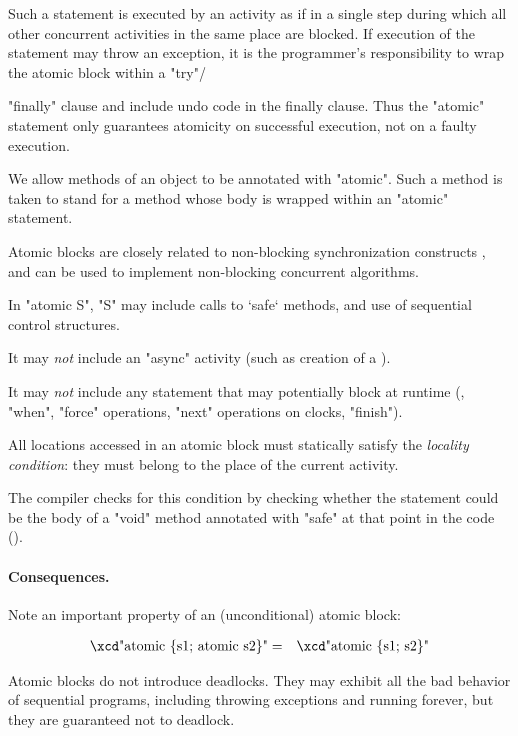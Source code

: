 Such a statement is executed by an activity as if in a single step
during which all other concurrent activities in the same place are
blocked. If execution of the statement may throw an exception, it is
the programmer's responsibility to wrap the atomic block within a
\xcd"try"/{\xcd"finally" clause and include undo code in the finally
clause. Thus the \xcd"atomic" statement only guarantees atomicity on
successful execution, not on a faulty execution.


We allow methods of an object to be annotated with \xcd"atomic". Such
a method is taken to stand for a method whose body is wrapped within an
\xcd"atomic" statement.

Atomic blocks are closely related to non-blocking synchronization
constructs \cite{herlihy91waitfree}, and can be used to implement 
non-blocking concurrent algorithms.

\begin{staticrule*}
In \xcd"atomic S", \xcd"S" may include calls to \xcd`safe` methods, and use of
sequential control structures.

It may {\em not} include an \xcd"async" activity (such as creation
of a ).

It may {\em not} include any statement that may potentially block at
runtime (\eg, \xcd"when", \xcd"force" operations, \xcd"next"
operations on clocks, \xcd"finish"). 

All locations accessed in an atomic block must statically satisfy the
{\em locality condition}: they must belong to the place of the current
activity.\label{LocalityCondition} 

\end{staticrule*}


The compiler checks for this condition by checking whether the statement
could be the body of a \xcd"void" method annotated with \xcd"safe" at
that point in the code ().

\paragraph{Consequences.}
Note an important property of an (unconditional) atomic block:

\begin{eqnarray}
 \mbox{\xcd"atomic \{s1; atomic s2\}"} &=& \mbox{\xcd"atomic \{s1; s2\}"}
\end{eqnarray}

Atomic blocks do not introduce deadlocks.    They may exhibit all the bad
behavior of sequential programs, including throwing exceptions and running
forever, but they are guaranteed not to deadlock.


}
